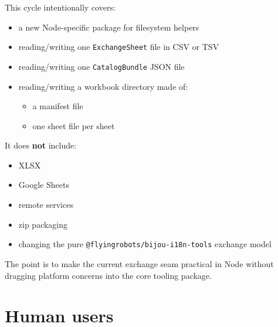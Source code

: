 This cycle intentionally covers:

\begin{itemize}
\tightlist
\item
  a new Node-specific package for filesystem helpers
\item
  reading/writing one \texttt{E\allowbreak{}x\allowbreak{}c\allowbreak{}h\allowbreak{}a\allowbreak{}n\allowbreak{}g\allowbreak{}e\allowbreak{}S\allowbreak{}h\allowbreak{}e\allowbreak{}e\allowbreak{}t} file in CSV or TSV
\item
  reading/writing one \texttt{C\allowbreak{}a\allowbreak{}t\allowbreak{}a\allowbreak{}l\allowbreak{}o\allowbreak{}g\allowbreak{}B\allowbreak{}u\allowbreak{}n\allowbreak{}d\allowbreak{}l\allowbreak{}e} JSON file
\item
  reading/writing a workbook directory made of:

  \begin{itemize}
  \tightlist
  \item
    a manifest file
  \item
    one sheet file per sheet
  \end{itemize}
\end{itemize}

It does \textbf{not} include:

\begin{itemize}
\tightlist
\item
  XLSX
\item
  Google Sheets
\item
  remote services
\item
  zip packaging
\item
  changing the pure \texttt{@\allowbreak{}f\allowbreak{}l\allowbreak{}y\allowbreak{}i\allowbreak{}n\allowbreak{}g\allowbreak{}r\allowbreak{}o\allowbreak{}b\allowbreak{}o\allowbreak{}t\allowbreak{}s\allowbreak{}/\allowbreak{}b\allowbreak{}i\allowbreak{}j\allowbreak{}o\allowbreak{}u\allowbreak{}-\allowbreak{}i\allowbreak{}1\allowbreak{}8\allowbreak{}n\allowbreak{}-\allowbreak{}t\allowbreak{}o\allowbreak{}o\allowbreak{}l\allowbreak{}s} exchange model
\end{itemize}

The point is to make the current exchange seam practical in Node without dragging platform concerns into the core tooling package.

\section{Human users}\label{record-192-human-users}

